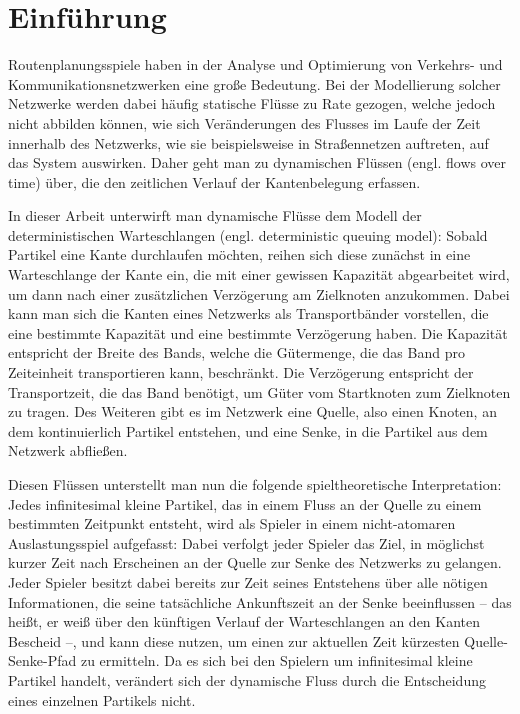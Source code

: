 \chapter{Einführung}\label{introduction}

Routenplanungsspiele haben in der Analyse und Optimierung von Verkehrs- und Kommunikationsnetzwerken eine große Bedeutung.
Bei der Modellierung solcher Netzwerke werden dabei häufig statische Flüsse zu Rate gezogen, welche jedoch nicht abbilden können, wie sich Veränderungen des Flusses im Laufe der Zeit innerhalb des Netzwerks, wie sie beispielsweise in Straßennetzen auftreten, auf das System auswirken.
Daher geht man zu dynamischen Flüssen (engl. flows over time) über, die den zeitlichen Verlauf der Kantenbelegung erfassen.

In dieser Arbeit unterwirft man dynamische Flüsse dem Modell der deterministischen Warteschlangen (engl. deterministic queuing model):
Sobald Partikel eine Kante durchlaufen möchten, reihen sich diese zunächst in eine Warteschlange der Kante ein, die mit einer gewissen Kapazität abgearbeitet wird, um dann nach einer zusätzlichen Verzögerung am Zielknoten anzukommen.
Dabei kann man sich die Kanten eines Netzwerks als Transportbänder vorstellen, die eine bestimmte Kapazität und eine bestimmte Verzögerung haben.
Die Kapazität entspricht der Breite des Bands, welche die Gütermenge, die das Band pro Zeiteinheit transportieren kann,  beschränkt.
Die Verzögerung entspricht der Transportzeit, die das Band benötigt, um Güter vom Startknoten zum Zielknoten zu tragen.
Des Weiteren gibt es im Netzwerk eine Quelle, also einen Knoten, an dem kontinuierlich Partikel entstehen, und eine Senke, in die Partikel aus dem Netzwerk abfließen.

Diesen Flüssen unterstellt man nun die folgende spieltheoretische Interpretation:
Jedes infinitesimal kleine Partikel, das in einem Fluss an der Quelle zu einem bestimmten Zeitpunkt entsteht, wird als Spieler in einem nicht-atomaren Auslastungsspiel aufgefasst:
Dabei verfolgt jeder Spieler das Ziel, in möglichst kurzer Zeit nach Erscheinen an der Quelle zur Senke des Netzwerks zu gelangen.
Jeder Spieler besitzt dabei bereits zur Zeit seines Entstehens über alle nötigen Informationen, die seine tatsächliche Ankunftszeit an der Senke beeinflussen -- das heißt, er weiß über den künftigen Verlauf der Warteschlangen an den Kanten Bescheid --, und kann diese nutzen, um einen zur aktuellen Zeit kürzesten Quelle-Senke-Pfad zu ermitteln.
Da es sich bei den Spielern um infinitesimal kleine Partikel handelt, verändert sich der dynamische Fluss durch die Entscheidung eines einzelnen Partikels nicht.

